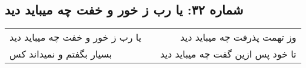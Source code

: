 \begin{center}
\section*{شماره ۳۲: یا رب ز خور و خفت چه میباید دید}
\label{sec:032}
\begin{longtable}{l p{0.5cm} r}
یا رب ز خور و خفت چه میباید دید
&&
وز تهمت پذرفت چه میباید دید
\\
بسیار بگفتم و نمیداند کس
&&
تا خود پس ازین گفت چه میباید دید
\\
\end{longtable}
\end{center}
